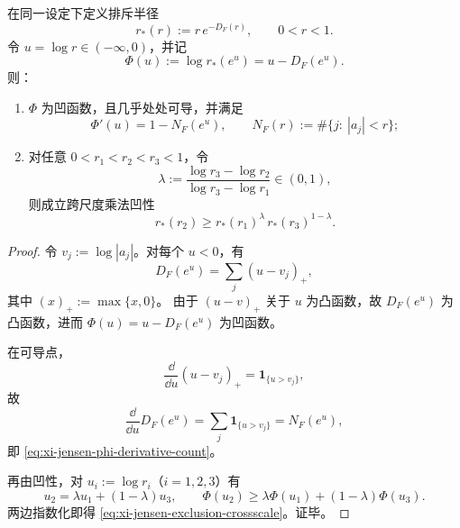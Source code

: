 \begin{theorem}[排斥半径的凹性与跨尺度误差传播不等式]\label{thm:xi-jensen-exclusion-radius-concavity-crossscale}
在同一设定下定义排斥半径
\[
r_\ast(r):=r\,e^{-D_F(r)},\qquad 0<r<1.
\]
令 \(u=\log r\in(-\infty,0)\)，并记
\[
\Phi(u):=\log r_\ast(e^u)=u-D_F(e^u).
\]
则：
\begin{enumerate}
  \item \(\Phi\) 为凹函数，且几乎处处可导，并满足
  \begin{equation}\label{eq:xi-jensen-phi-derivative-count}
  \Phi'(u)=1-N_F(e^u),\qquad
  N_F(r):=\#\{j:\ |a_j|<r\};
  \end{equation}
  \item 对任意 \(0<r_1<r_2<r_3<1\)，令
  \[
  \lambda:=\frac{\log r_3-\log r_2}{\log r_3-\log r_1}\in(0,1),
  \]
  则成立跨尺度乘法凹性
  \begin{equation}\label{eq:xi-jensen-exclusion-crossscale}
  \boxed{\;
  r_\ast(r_2)\ge r_\ast(r_1)^{\lambda}\,r_\ast(r_3)^{1-\lambda}. \;}
  \end{equation}
\end{enumerate}
\end{theorem}
\begin{proof}
令 \(v_j:=\log|a_j|\)。对每个 \(u<0\)，有
\[
D_F(e^u)=\sum_j (u-v_j)_+,
\]
其中 \((x)_+:=\max\{x,0\}\)。
由于 \((u-v)_+\) 关于 \(u\) 为凸函数，故 \(D_F(e^u)\) 为凸函数，进而 \(\Phi(u)=u-D_F(e^u)\) 为凹函数。

在可导点，
\[
\frac{\dd}{\dd u}(u-v_j)_+=\mathbf 1_{\{u>v_j\}},
\]
故
\[
\frac{\dd}{\dd u}D_F(e^u)=\sum_j\mathbf 1_{\{u>v_j\}}=N_F(e^u),
\]
即 \eqref{eq:xi-jensen-phi-derivative-count}。

再由凹性，对 \(u_i:=\log r_i\)（\(i=1,2,3\)）有
\[
u_2=\lambda u_1+(1-\lambda)u_3,\qquad
\Phi(u_2)\ge \lambda\Phi(u_1)+(1-\lambda)\Phi(u_3).
\]
两边指数化即得
\eqref{eq:xi-jensen-exclusion-crossscale}。证毕。
\end{proof}

